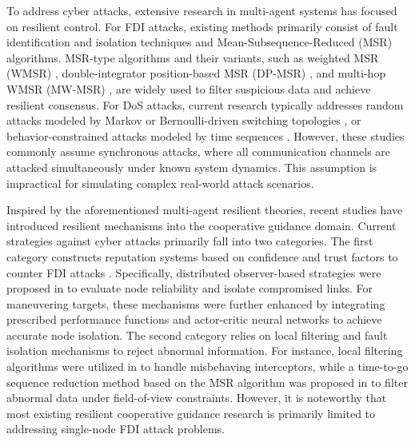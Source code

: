 \documentclass[lettersize,journal]{IEEEtran}
\begin{document}
To address cyber attacks, extensive research in multi-agent systems has focused on resilient control. For FDI attacks, existing methods primarily consist of fault identification and isolation techniques \cite{0Partial,tang2019linear} and Mean-Subsequence-Reduced (MSR) algorithms. MSR-type algorithms and their variants, such as weighted MSR (WMSR) \cite{leblanc2013resilient}, double-integrator position-based MSR (DP-MSR) \cite{fiore2019resilient}, and multi-hop WMSR (MW-MSR) \cite{yuan2025asynchronous}, are widely used to filter suspicious data and achieve resilient consensus. For DoS attacks, current research typically addresses random attacks modeled by Markov or Bernoulli-driven switching topologies \cite{11025995,ali2024fully}, or behavior-constrained attacks modeled by time sequences \cite{liu2022data, zhang2022resilient, gao2025resilient}. However, these studies commonly assume synchronous attacks, where all communication channels are attacked simultaneously under known system dynamics. This assumption is impractical for simulating complex real-world attack scenarios.

Inspired by the aforementioned multi-agent resilient theories, recent studies have introduced resilient mechanisms into the cooperative guidance domain. Current strategies against cyber attacks primarily fall into two categories. The first category constructs reputation systems based on confidence and trust factors to counter FDI attacks \cite{10038503, 10506534, 10697934, 10834565}. Specifically, distributed observer-based strategies were proposed in \cite{10038503, 10506534} to evaluate node reliability and isolate compromised links. For maneuvering targets, these mechanisms were further enhanced by integrating prescribed performance functions \cite{10697934} and actor-critic neural networks \cite{10834565} to achieve accurate node isolation. The second category relies on local filtering and fault isolation mechanisms to reject abnormal information. For instance, local filtering algorithms were utilized in \cite{8303222, wang2020robust} to handle misbehaving interceptors, while a time-to-go sequence reduction method based on the MSR algorithm was proposed in \cite{10878455} to filter abnormal data under field-of-view constraints. However, it is noteworthy that most existing resilient cooperative guidance research is primarily limited to addressing single-node FDI attack problems.
\end{document}
